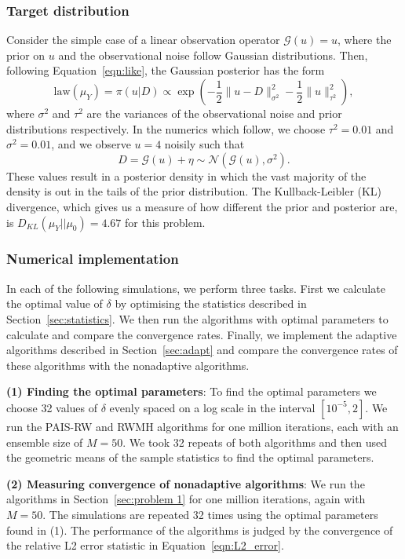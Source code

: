 \documentclass[final]{siamltex}
\newcommand{\G}{\mathcal{G}}
\begin{document}
\subsubsection{Target distribution}

Consider the simple case of a linear observation operator $\G(u) = u$, where the prior on $u$ and the observational noise follow Gaussian distributions. Then, following Equation~\ref{eqn:like}, the Gaussian posterior has the form
\begin{equation}\label{eqn:Gaussian posterior}
	\text{law}(\mu_Y) = \pi(u|D) \propto \exp\left(-\frac{1}{2}\big\|u - D\big\|^2_{\sigma^2} - \frac{1}{2}\big\|u\big\|^2_{\tau^2}\right),
\end{equation}
where $\sigma^2$ and $\tau^2$ are the variances of the
observational noise and prior distributions respectively. In the
numerics which follow, we choose $\tau^2 =0.01$ and $\sigma^2 = 0.01$, and
we observe $u=4$ noisily such that
\[
D = \mathcal{G}(u) + \eta \sim \mathcal{N}(\mathcal{G}(u),\sigma^2).
\]
These values result in a posterior density in which the vast majority
of the density is out in the tails of the
prior distribution. The Kullback-Leibler (KL)
divergence, which gives us a measure of how different the prior and
posterior are, is $D_{KL}(\mu_Y || \mu_0) = 4.67$ for this problem.

\subsubsection{Numerical implementation}\label{sec:Implementation P1}

In each of the following simulations, we perform three tasks. First we calculate the optimal value of $\delta$ by optimising the statistics described in Section~\ref{sec:statistics}. We then run the algorithms with optimal parameters to calculate and compare the convergence rates. Finally, we implement the adaptive algorithms described in Section~\ref{sec:adapt} and compare the convergence rates of these algorithms with the nonadaptive algorithms.

{\bf (1) Finding the optimal parameters}: To find the optimal
parameters we choose 32 values of $\delta$ evenly spaced on a log scale
in the interval $[10^{-5}, 2]$. We run the PAIS-RW and RWMH algorithms for one million iterations, each with an ensemble size of $M=50$. We took 32 repeats of both algorithms and then used the geometric means of the sample statistics to find the optimal parameters.

{\bf (2) Measuring convergence of nonadaptive algorithms}: We run the algorithms in Section~\ref{sec:problem 1} for one million iterations, again with $M=50$. The simulations are repeated 32 times using the optimal parameters found in (1). The performance of the algorithms is judged by the convergence of the relative L2 error statistic in Equation~\ref{eqn:L2_error}.
\end{document}

